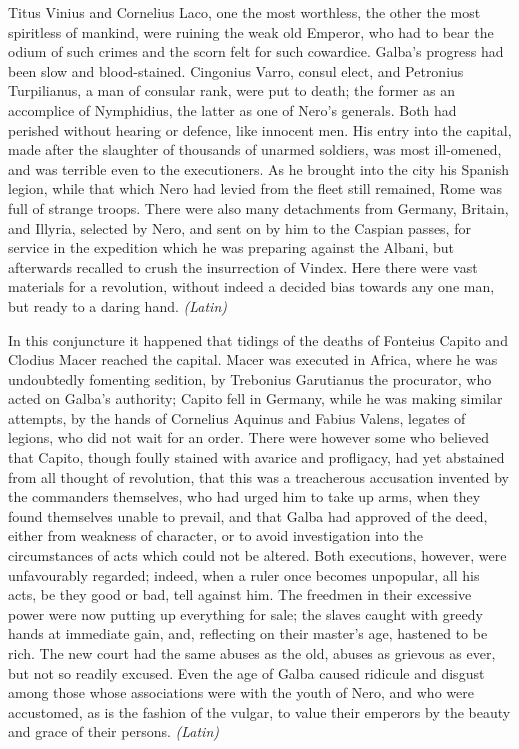 
Titus Vinius and Cornelius Laco, one the most worthless, the other the most spiritless of mankind, were ruining the weak old Emperor, who had to bear the odium of such crimes and the scorn felt for such cowardice. Galba's progress had been slow and blood-stained. Cingonius Varro, consul elect, and Petronius Turpilianus, a man of consular rank, were put to death; the former as an accomplice of Nymphidius, the latter as one of Nero's generals. Both had perished without hearing or defence, like innocent men. His entry into the capital, made after the slaughter of thousands of unarmed soldiers, was most ill-omened, and was terrible even to the executioners. As he brought into the city his Spanish legion, while that which Nero had levied from the fleet still remained, Rome was full of strange troops. There were also many detachments from Germany, Britain, and Illyria, selected by Nero, and sent on by him to the Caspian passes, for service in the expedition which he was preparing against the Albani, but afterwards recalled to crush the insurrection of Vindex. Here there were vast materials for a revolution, without indeed a decided bias towards any one man, but ready to a daring hand. \emph{(Latin)}


In this conjuncture it happened that tidings of the deaths of Fonteius Capito and Clodius Macer reached the capital. Macer was executed in Africa, where he was undoubtedly fomenting sedition, by Trebonius Garutianus the procurator, who acted on Galba's authority; Capito fell in Germany, while he was making similar attempts, by the hands of Cornelius Aquinus and Fabius Valens, legates of legions, who did not wait for an order. There were however some who believed that Capito, though foully stained with avarice and profligacy, had yet abstained from all thought of revolution, that this was a treacherous accusation invented by the commanders themselves, who had urged him to take up arms, when they found themselves unable to prevail, and that Galba had approved of the deed, either from weakness of character, or to avoid investigation into the circumstances of acts which could not be altered. Both executions, however, were unfavourably regarded; indeed, when a ruler once becomes unpopular, all his acts, be they good or bad, tell against him. The freedmen in their excessive power were now putting up everything for sale; the slaves caught with greedy hands at immediate gain, and, reflecting on their master's age, hastened to be rich. The new court had the same abuses as the old, abuses as grievous as ever, but not so readily excused. Even the age of Galba caused ridicule and disgust among those whose associations were with the youth of Nero, and who were accustomed, as is the fashion of the vulgar, to value their emperors by the beauty and grace of their persons. \emph{(Latin)}

